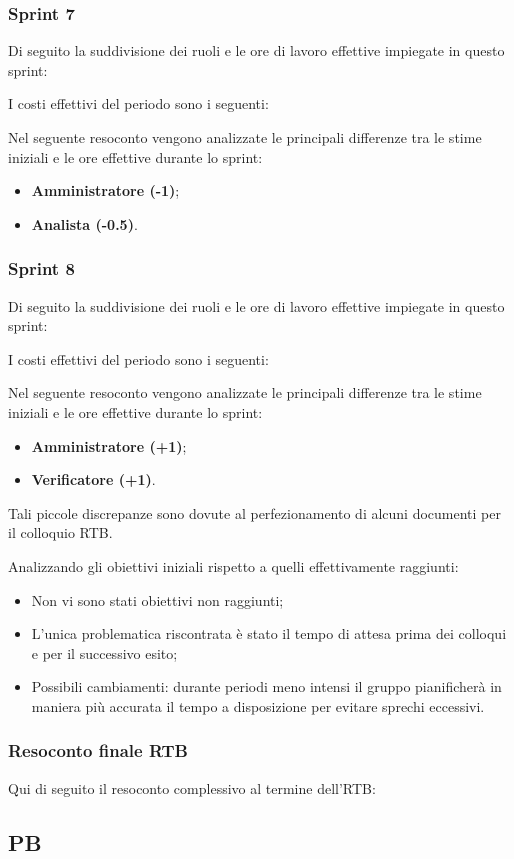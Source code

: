\pagebreak
\subsubsection{Sprint 7}
Di seguito la suddivisione dei ruoli e le ore di lavoro effettive impiegate in
questo sprint:



I costi effettivi del periodo sono i seguenti:



Nel seguente resoconto vengono analizzate le principali differenze tra le stime iniziali e le ore effettive durante lo sprint:
\begin{itemize}
    \item \textbf{Amministratore (-1)}; 
    \item \textbf{Analista (-0.5)}.
\end{itemize}



\subsubsection{Sprint 8}
Di seguito la suddivisione dei ruoli e le ore di lavoro effettive impiegate in questo sprint:



I costi effettivi del periodo sono i seguenti:



Nel seguente resoconto vengono analizzate le principali differenze tra le stime iniziali e le ore effettive durante lo sprint:
\begin{itemize}
    \item \textbf{Amministratore (+1)}; 
    \item \textbf{Verificatore (+1)}.
\end{itemize}
Tali piccole discrepanze sono dovute al perfezionamento di alcuni documenti per il colloquio RTB.


Analizzando gli obiettivi iniziali rispetto a quelli effettivamente raggiunti:
\begin{itemize}
    \item Non vi sono stati obiettivi non raggiunti; 
    \item L'unica problematica riscontrata è stato il tempo di attesa prima dei colloqui e per il successivo esito;
    \item Possibili cambiamenti: durante periodi meno intensi il gruppo pianificherà in maniera più accurata il tempo a disposizione per evitare sprechi eccessivi.
\end{itemize}
\pagebreak

\subsubsection{Resoconto finale RTB}
Qui di seguito il resoconto complessivo al termine dell'RTB:


\pagebreak

\subsection{PB}

